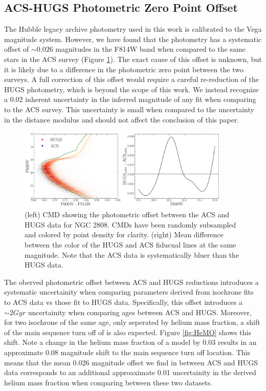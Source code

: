 \subsection{ACS-HUGS Photometric Zero Point Offset}
The Hubble legacy archive photometry used in this work is calibrated to the
Vega magnitude system. However, we have found that the photometry has a
systematic offset of $\sim0.026$ magnitudes in the F814W band when
compared to the same stars in the ACS survey (Figure \ref{fig:offset}). The
exact cause of this offset is unknown, but it is likely due to a difference in
the photometric zero point between the two surveys. A full correction of this
offset would require a careful re-reduction of the HUGS photometry, which is
beyond the scope of this work. We instead recognize a 0.02 inherent uncertainty
in the inferred magnitude of any fit when comparing to the ACS survey. This
uncertainty is small when compared to the uncertainty in the
distance modulus and should not affect the conclusion of this
paper. 

\begin{figure}
  \centering
  \includegraphics[width=0.90\textwidth]{photometricOffset.pdf}
  \caption{(left) CMD showing the photometric offset between the ACS and HUGS data for NGC 2808. CMDs have been randomly subsampled and colored by point density for clarity. (right) Mean difference between the color of the HUGS and ACS fiducual lines at the same magnitude. Note that the ACS data is systematically bluer than the HUGS data.}
  \label{fig:offset}
\end{figure}

The oberved photometric offset between ACS and HUGS reductions introduces a
systematic uncertainity when comparing parameters derived from isochrone fits
to ACS data vs those fit to HUGS data. Specifically, this offset introduces a
$\sim 2 Gyr$ uncertainity when comparing ages between ACS and HUGS. Moreover,
for two isochrone of the same age, only seperated by helium mass fraction, a
shift of the main sequence turn off of is also expected. Figure \ref{fig:HeMO}
shows this shift. Note a change in the helium mass fraction of a model by 0.03
results in an approximate 0.08 magnitude shift to the main sequence turn off
location. This means that the mean 0.026 magnitude offset we find in between
ACS and HUGS data corresponds to an additional approaximate 0.01 uncertainity
in the derived helium mass fraction when comparing between these two datasets. 


